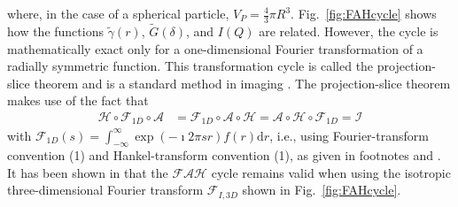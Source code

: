 where, in the case of a spherical particle, $V_P=\frac43 \pi R^3$.
Fig.\ \ref{fig:FAHcycle} shows how the functions $\tilde{\gamma}(r)$, $\tilde{G}(\delta)$, and $I(Q)$ are related. However, the cycle is mathematically exact only for a one-dimensional Fourier transformation of a radially symmetric function. This transformation cycle is called the projection-slice theorem and is a standard method in imaging \cite{Bracewell2003, Bracewell1956}. The projection-slice theorem makes use of the fact that
\begin{align}
\mathcal{H}\circ \mathcal{F}_{1D}\circ \mathcal{A} &
              =\mathcal{F}_{1D} \circ \mathcal{A}\circ \mathcal{H}
              =\mathcal{A}\circ \mathcal{H}\circ \mathcal{F}_{1D}=\mathcal{I}
\end{align}
with $\mathcal{F}_{1D}(s)=\int_{-\infty}^{\infty} \exp\left(-\imath 2\pi s r\right) f(r) \mathrm{d}r$, i.e., using Fourier-transform convention (1) and Hankel-transform convention (1), as given in footnotes and . It has been shown in \cite{Kohlbrecher2017} that the $\mathcal{FAH}$ cycle remains valid when using the isotropic three-dimensional Fourier transform $\mathcal{F}_{I,3D}$ shown in Fig.\ \ref{fig:FAHcycle}.

